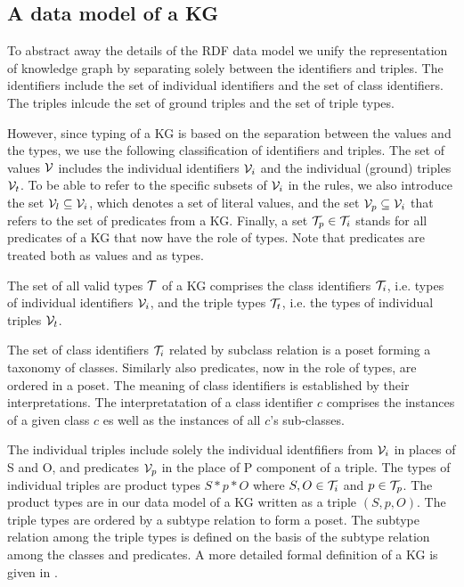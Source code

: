 \documentclass[runningheads]{llncs}
\newcommand{\I}{{\cal I}}
\newcommand{\V}{{\cal V}}
\newcommand{\T}{{\cal T}}
\begin{document}





\subsection{A data model of a KG}

To abstract away the details of the RDF data model we unify the
representation of knowledge graph by separating solely between the
identifiers and triples. The identifiers include the set of individual
identifiers and the set of class identifiers. The triples inlcude the
set of ground triples and the set of triple types.


However, since typing of a KG is based on the separation between the
values and the types, we use the following classification of
identifiers and triples. The set of values $\V$ includes the
individual identifiers $\V_i$ and the individual (ground) triples
$\V_t$. To be able to refer to the specific subsets of $\V_i$ in the
rules, we also introduce the set $\V_l\subseteq\V_i$, which denotes a
set of literal values, and the set $\V_p\subseteq\V_i$ that refers to
the set of predicates from a KG. Finally, a set $\T_p\in\T_i$ stands
for all predicates of a KG that now have the role of types. Note that
predicates are treated both as values and as types.

The set of all valid types $\T$ of a KG comprises the class
identifiers $\T_i$, i.e. types of individual identifiers $\V_i$, and
the triple types $\T_t$, i.e. the types of individual triples $\V_t$.

The set of class identifiers $\T_i$ related by subclass relation is a
poset forming a taxonomy of classes. Similarly also predicates, now
in the role of types, are ordered in a poset. The meaning of class
identifiers is established by their interpretations. The
interpretatation of a class identifier $c$ comprises the instances of
a given class $c$ es well as the instances of all $c$'s sub-classes. 

The individual triples include solely the individual identfifiers from
$\V_i$ in places of S and O, and predicates $\V_p$ in the place of P
component of a triple. The types of individual triples are product
types $S*p*O$ where $S,O\in\T_i$ and $p\in\T_p$. The product types are
in our data model of a KG written as a triple $(S,p,O)$. The triple
types are ordered by a subtype relation to form a poset. The subtype
relation among the triple types is defined on the basis of the subtype
relation among the classes and predicates. A more detailed formal
definition of a KG is given in \cite{Savnik2025}.
\end{document}
